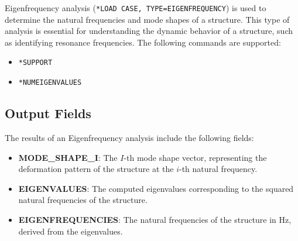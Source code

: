 Eigenfrequency analysis (\texttt{*LOAD CASE, TYPE=EIGENFREQUENCY}) is used to determine the natural frequencies and
mode shapes of a structure. This type of analysis is essential for understanding the dynamic behavior of a structure,
such as identifying resonance frequencies. The following commands are supported:

\begin{itemize}
    \item \texttt{*SUPPORT}
    \item \texttt{*NUMEIGENVALUES}
\end{itemize}

\subsection{Output Fields}
The results of an Eigenfrequency analysis include the following fields:

\begin{itemize}
    \item \textbf{MODE\_SHAPE\_I}: The $I$-th mode shape vector, representing the deformation pattern of the structure at the $i$-th natural frequency.
    \item \textbf{EIGENVALUES}: The computed eigenvalues corresponding to the squared natural frequencies of the structure.
    \item \textbf{EIGENFREQUENCIES}: The natural frequencies of the structure in Hz, derived from the eigenvalues.
\end{itemize}

\newpage

